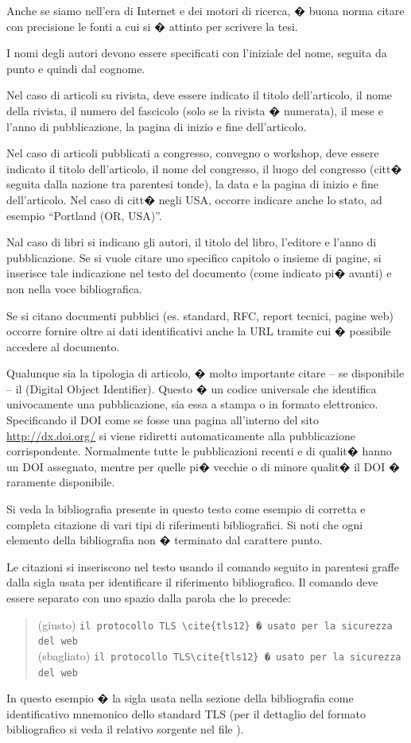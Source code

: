 Anche se siamo nell'era di Internet e dei motori di ricerca, � buona norma citare con precisione le fonti a cui si � attinto per scrivere la tesi. 

I nomi degli autori devono essere specificati con l'iniziale del nome, seguita da punto e quindi dal cognome.

Nel caso di articoli su rivista, deve essere indicato il titolo dell'articolo, il nome della rivista, il numero del fascicolo (solo se la rivista � numerata), il mese e l'anno di pubblicazione,  la pagina di inizio e fine dell'articolo.

Nel caso di articoli pubblicati a congresso, convegno o workshop, deve essere indicato il titolo dell'articolo, il nome del congresso, il luogo del congresso (citt� seguita dalla nazione tra parentesi tonde), la data e la pagina di inizio e fine dell'articolo.
Nel caso di citt� negli USA, occorre indicare anche lo stato, ad esempio ``Portland (OR, USA)''.

Nal caso di libri si indicano gli autori, il titolo del libro, l'editore e l'anno di pubblicazione. Se si vuole citare uno specifico capitolo o insieme di pagine, si inserisce tale indicazione nel testo del documento (come indicato pi� avanti) e non nella voce bibliografica.

Se si citano documenti pubblici (es. standard, RFC, report tecnici, pagine web) occorre fornire oltre ai dati identificativi anche la URL tramite cui � possibile accedere al documento.

Qualunque sia la tipologia di articolo, � molto importante citare -- se disponibile -- il  (Digital Object Identifier). Questo � un codice universale che identifica univocamente una pubblicazione, sia essa a stampa o in formato elettronico. Specificando il DOI come se fosse una pagina all'interno del sito \url{http://dx.doi.org/} si viene ridiretti automaticamente alla pubblicazione corrispondente. Normalmente tutte le pubblicazioni recenti e di qualit� hanno un DOI assegnato, mentre per quelle pi� vecchie o di minore qualit� il DOI � raramente disponibile.

Si veda la bibliografia presente in questo testo come esempio di corretta e completa citazione di vari tipi di riferimenti bibliografici.
Si noti che ogni elemento della bibliografia non � terminato dal carattere punto.

Le citazioni si inseriscono nel testo usando il comando  seguito in parentesi graffe dalla sigla usata per identificare il riferimento bibliografico.
Il comando  deve essere separato con uno spazio dalla parola che lo precede:
\begin{quote}
(giusto) \verb+il protocollo TLS \cite{tls12} � usato per la sicurezza del web+
\\
(sbagliato) \verb+il protocollo TLS\cite{tls12} � usato per la sicurezza del web+
\end{quote}
In questo esempio  � la sigla usata nella sezione della bibliografia come identificativo mnemonico dello standard TLS (per il dettaglio del formato bibliografico si veda il relativo sorgente nel file ).


